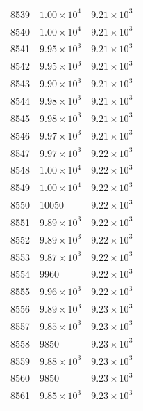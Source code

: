 \begin{table}[H]
\begin{tabular}{lll}
8539 & $\displaystyle 1.00 \times 10^{4}$ & $\displaystyle 9.21 \times 10^{3}$ \\
8540 & $\displaystyle 1.00 \times 10^{4}$ & $\displaystyle 9.21 \times 10^{3}$ \\
8541 & $\displaystyle 9.95 \times 10^{3}$ & $\displaystyle 9.21 \times 10^{3}$ \\
8542 & $\displaystyle 9.95 \times 10^{3}$ & $\displaystyle 9.21 \times 10^{3}$ \\
8543 & $\displaystyle 9.90 \times 10^{3}$ & $\displaystyle 9.21 \times 10^{3}$ \\
8544 & $\displaystyle 9.98 \times 10^{3}$ & $\displaystyle 9.21 \times 10^{3}$ \\
8545 & $\displaystyle 9.98 \times 10^{3}$ & $\displaystyle 9.21 \times 10^{3}$ \\
8546 & $\displaystyle 9.97 \times 10^{3}$ & $\displaystyle 9.21 \times 10^{3}$ \\
8547 & $\displaystyle 9.97 \times 10^{3}$ & $\displaystyle 9.22 \times 10^{3}$ \\
8548 & $\displaystyle 1.00 \times 10^{4}$ & $\displaystyle 9.22 \times 10^{3}$ \\
8549 & $\displaystyle 1.00 \times 10^{4}$ & $\displaystyle 9.22 \times 10^{3}$ \\
8550 & 10050 & $\displaystyle 9.22 \times 10^{3}$ \\
8551 & $\displaystyle 9.89 \times 10^{3}$ & $\displaystyle 9.22 \times 10^{3}$ \\
8552 & $\displaystyle 9.89 \times 10^{3}$ & $\displaystyle 9.22 \times 10^{3}$ \\
8553 & $\displaystyle 9.87 \times 10^{3}$ & $\displaystyle 9.22 \times 10^{3}$ \\
8554 & 9960 & $\displaystyle 9.22 \times 10^{3}$ \\
8555 & $\displaystyle 9.96 \times 10^{3}$ & $\displaystyle 9.22 \times 10^{3}$ \\
8556 & $\displaystyle 9.89 \times 10^{3}$ & $\displaystyle 9.23 \times 10^{3}$ \\
8557 & $\displaystyle 9.85 \times 10^{3}$ & $\displaystyle 9.23 \times 10^{3}$ \\
8558 & 9850 & $\displaystyle 9.23 \times 10^{3}$ \\
8559 & $\displaystyle 9.88 \times 10^{3}$ & $\displaystyle 9.23 \times 10^{3}$ \\
8560 & 9850 & $\displaystyle 9.23 \times 10^{3}$ \\
8561 & $\displaystyle 9.85 \times 10^{3}$ & $\displaystyle 9.23 \times 10^{3}$ \\

\end{tabular}
\end{table}
